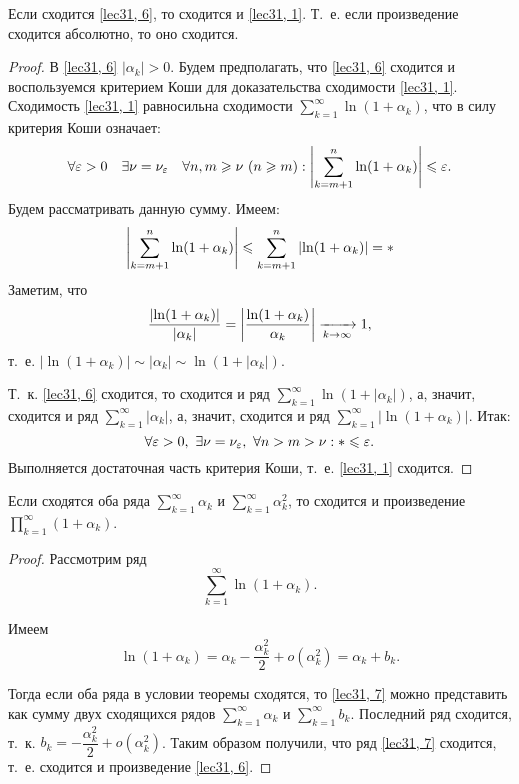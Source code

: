 \documentclass[../../main.tex]{subfiles}
\begin{document}
	\begin{thm}
		Если сходится \eqref{lec31, 6}, то сходится и \eqref{lec31, 1}. Т.~е. если 
		произведение сходится абсолютно, то оно сходится.
		\begin{proof}
			В \eqref{lec31, 6} $|\alpha_k| > 0$. Будем предполагать, что 
			\eqref{lec31, 6} сходится и воспользуемся критерием Коши для доказательства 
			сходимости \eqref{lec31, 1}. Сходимость \eqref{lec31, 1} равносильна 
			сходимости $\sum\limits_{k = 1}^{\infty} \ln (1 + \alpha_k)$, что в силу 
			критерия Коши означает:
			\[\forall \varepsilon > 0\quad \exists \nu = \nu_\varepsilon\quad \forall n, m 
			\geqslant \nu\ (n \geqslant m): \left|{\sum\limits_{k = m + 1}^{n} \ln(1 + 
			\alpha_k)}\right| \leqslant \varepsilon.\]
			Будем рассматривать данную сумму. Имеем:
			\[\left|{\sum\limits_{k = m + 1}^{n} \ln(1 + \alpha_k)}\right| \leqslant 
			\sum\limits_{k = m + 1}^{n} \left|{\ln(1 + \alpha_k)}\right| = *\]
			Заметим, что
			\[\frac{\left|{\ln(1 + \alpha_k)}\right|}{|\alpha_k|} = 
			\left|{ \frac{\ln(1 + \alpha_k)}{\alpha_k}}\right| \xrightarrow[k\to\infty]{} 1,\] т.~е. $| 
			\ln(1 + \alpha_k) | \sim |\alpha_k| \sim \ln(1 + |\alpha_k|)$.
			
			Т.~к. \eqref{lec31, 6} сходится, то сходится и ряд $\sum\limits_{k = 
			1}^{\infty} \ln(1 + |\alpha_k|)$, а, значит, сходится и ряд 
			$\sum\limits_{k = 1}^{\infty} |\alpha_k|$, а, значит,
			сходится и ряд $\sum\limits_{k = 1}^{\infty} |\ln(1 + \alpha_k)|$. Итак:
			\[\forall \varepsilon > 0,\ \exists \nu = \nu_\varepsilon,\ \forall n > m > 
			\nu: * \leqslant \varepsilon.\]
			Выполняется достаточная часть критерия 
			Коши, т.~е. \eqref{lec31, 1} сходится.
		\end{proof}
	\end{thm}

	\begin{thm}
		Если сходятся оба ряда $\sum\limits_{k = 1}^{\infty} \alpha_k$ и 
		$\sum\limits_{k = 1}^{\infty} \alpha_k^2$, то сходится и произведение 
		${\prod\limits_{k = 
		1}^{\infty} (1 + \alpha_k)}$.
		
		\begin{proof}
			Рассмотрим ряд
			\begin{equation}\label{lec31, 7}
				\sum\limits_{k = 1}^{\infty} \ln(1 + \alpha_k).
			\end{equation}
			
			Имеем \[\ln(1 + \alpha_k) = \alpha_k - \frac{\alpha_k^2}{2} + o(\alpha_k^2) 
			= \alpha_k + b_k.\]
			
			Тогда если оба ряда в условии теоремы сходятся, то \eqref{lec31, 7} 
			можно представить как сумму двух сходящихся рядов $\sum\limits_{k = 
			1}^{\infty} 
			\alpha_k$ и $\sum\limits_{k = 1}^{\infty} b_k$. Последний ряд сходится, 
			т.~к. $b_k = -\dfrac{\alpha_k^2}2 + o(\alpha_k^2)$. Таким образом получили, 
			что ряд \eqref{lec31, 7} сходится, т.~е. сходится и произведение 
			\eqref{lec31, 6}.
		\end{proof}
	\end{thm}
\end{document}

